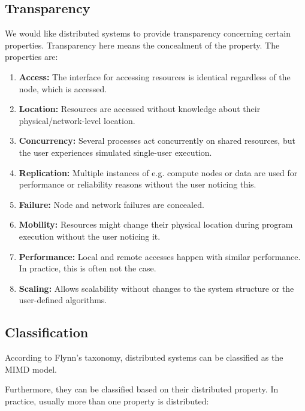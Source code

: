 \subsection{Transparency}

We would like distributed systems to provide transparency concerning certain properties. Transparency here means the concealment of the property. The properties are:

\begin{enumerate}
    \item \textbf{Access:} The interface for accessing resources is identical regardless of the node, which is accessed.
    \item \textbf{Location:} Resources are accessed without knowledge about their physical/network-level location.
    \item \textbf{Concurrency:} Several processes act concurrently on shared resources, but the user experiences simulated single-user execution.
    \item \textbf{Replication:} Multiple instances of e.g. compute nodes or data are used for performance or reliability reasons without the user noticing this.
    \item \textbf{Failure:} Node and network failures are concealed.
    \item \textbf{Mobility:} Resources might change their physical location during program execution without the user noticing it.
    \item \textbf{Performance:} Local and remote accesses happen with similar performance. In practice, this is often not the case.
    \item \textbf{Scaling:} Allows scalability without changes to the system structure or the user-defined algorithms.
\end{enumerate}

\subsection{Classification}

According to Flynn's taxonomy, distributed systems can be classified as the \ac{MIMD} model.

Furthermore, they can be classified based on their distributed property. In practice, usually more than one property is distributed:

